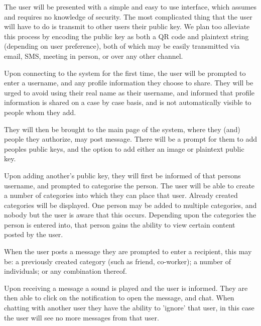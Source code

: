 The user will be presented with a simple and easy to use interface, which
assumes and requires no knowledge of security. The most complicated thing that
the user will have to do is transmit to other users their public key. We plan
too alleviate this process by encoding the public key as both a QR code and
plaintext string (depending on user preference), both of which may be easily
transmitted via email, SMS, meeting in person, or over any other channel.

Upon connecting to the system for the first time, the user will be prompted to
enter a username, and any profile information they choose to share. They will be
urged to avoid using their real name as their username, and informed that
profile information is shared on a case by case basis, and is not automatically
visible to people whom they add.

They will then be brought to the main page of the system, where they (and)
people they authorize, may post message. There will be a prompt for them to add
peoples public keys, and the option to add either an image or plaintext public
key.

Upon adding another's public key, they will first be informed of that persons
username, and prompted to categorise the person. The user will be able to create
a number of categories into which they can place that user. Already created
categories will be displayed. One person may be added to multiple categories,
and nobody but the user is aware that this occurs. Depending upon the categories
the person is entered into, that person gains the ability to view certain
content posted by the user.

When the user posts a message they are prompted to enter a recipient, this may
be: a previously created category (such as friend, co-worker); a number
of individuals; or any combination thereof.

Upon receiving a message a sound is played and the user is informed. They are
then able to click on the notification to open the message, and chat. When
chatting with another user they have the ability to 'ignore' that user, in this
case the user will see no more messages from that user.
